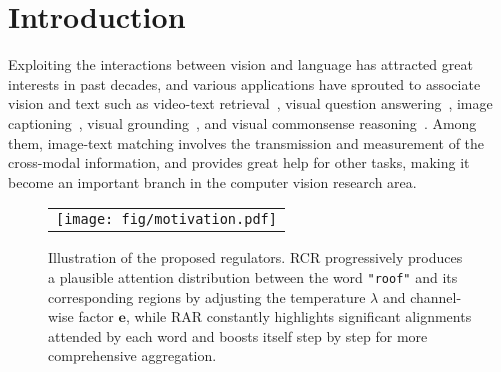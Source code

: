 \documentclass[journal]{IEEEtran}\newcommand{\ignore}[1]{}
\begin{document}
\section{Introduction}
Exploiting the interactions between vision and language has attracted great interests in past decades, and various applications have sprouted to associate vision and text such as video-text retrieval~\cite{HGR,EHLS,HIT}, visual question answering~\cite{DAN}, image captioning~\cite{BU_TDA}, visual grounding~\cite{LGGAN}, and visual commonsense reasoning~\cite{VCR}. Among them, image-text matching involves the transmission and measurement of the cross-modal information, and provides great help for other tasks, making it become an important branch in the computer vision research area.

\begin{figure}[htpb]
	\centering
	\begin{tabular}{@{}c}
    	\texttt{[image: fig/motivation.pdf]} 
	\end{tabular}
	\caption{Illustration of the proposed regulators. RCR progressively produces a plausible attention distribution between the word \texttt{"roof"} and its corresponding regions by adjusting the temperature $\lambda$ and channel-wise factor $\boldsymbol{e}$, while RAR constantly highlights significant alignments attended by each word and boosts itself step by step for more comprehensive aggregation.}
	\label{fig:motivation}
\end{figure}
\end{document}
